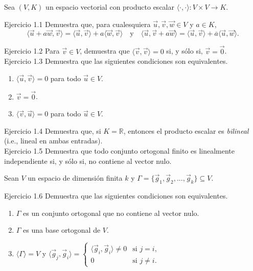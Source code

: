 \documentclass[12pt,dvipsnames]{article}
\numberwithin{equation}{section}
\begin{document}
\begin{center}
    Sea $(V,K)$ un espacio vectorial con producto escalar $\langle\cdot,\cdot\rangle:V\times V\to K$.
\end{center}

Ejercicio 1.1 Demuestra que,  para cualesquiera $\vec{u},\vec{v},\vec{w}\in V$ y $a\in K$,
\[
    \langle \vec{u} + a\vec{w}, \vec{v}\rangle = \langle \vec{u},\vec{v}\rangle + a\langle \vec{w}, \vec{v}\rangle \quad \text{y} \quad \langle \vec{u}, \vec{v} + a\vec{w}\rangle = \langle \vec{u},\vec{v}\rangle + \overline{a}\langle \vec{u}, \vec{w}\rangle.
\] 

Ejercicio 1.2 Para $\vec{v}\in V$, demuestra que $\langle \vec{v} , \vec{v} \rangle = 0$ si, y sólo si, $\vec{v}=\vec{0}$. \\

Ejercicio 1.3 Demuestra que las siguientes condiciones son equivalentes. %

\begin{enumerate}[label=(\alph*)]
    \item $\langle \vec{u} , \vec{v} \rangle = 0$ para todo $\vec{u}\in V$.

    \item $\vec{v}=\vec{0}$.

    \item $\langle \vec{v} , \vec{u} \rangle = 0$ para todo $\vec{u}\in V$.
\end{enumerate}

Ejercicio 1.4 Demuestra que, si $K=\mathbb{R}$, entonces el producto escalar es \emph{bilineal} (i.e., lineal en ambas entradas). \\

Ejercicio 1.5 Demuestra que todo conjunto ortogonal finito es linealmente independiente si, y sólo si, no contiene al vector nulo. \\

\begin{center}
Sean $V$ un espacio de dimensión finita $k$ y $\Gamma=\{\vec{g}_1,\vec{g}_2,...,\vec{g}_k\}\subseteq V$.
\end{center}

Ejercicio 1.6 Demuestra que las siguientes condiciones son equivalentes. 

\begin{enumerate}[label=(\alph*)]
    \item $\Gamma$ es un conjunto ortogonal que no contiene al vector nulo.

    \item $\Gamma$ es una base ortogonal de $V$.

    \item $\langle \Gamma \rangle = V$ y $\langle \vec{g}_j , \vec{g}_i \rangle = \begin{cases} \langle \vec{g}_i , \vec{g}_i \rangle \neq 0 &\text{si } j=i, \\ 0 &\text{si } j \neq i. \end{cases}$
\end{enumerate} 
\end{document}
